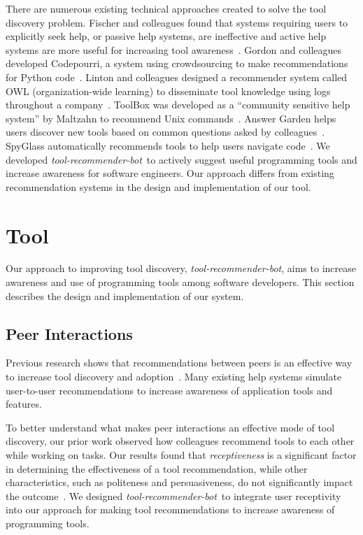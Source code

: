 \documentclass[conference]{IEEEtran}
\newcommand{\tool}{\textsl{tool-recommender-bot}}
\begin{document}
There are numerous existing technical approaches created to solve the tool discovery problem. Fischer and colleagues found that systems requiring users to explicitly seek help, or passive help systems, are ineffective and active help systems are more useful for increasing tool awareness~\cite{Fischer1984ActiveHelpSystems}. Gordon and colleagues developed Codepourri, a system using crowdsourcing to make recommendations for Python code~\cite{Gordon2015Codepourri}. Linton and colleagues designed a recommender system called OWL (organization-wide learning) to disseminate tool knowledge using logs throughout a company~\cite{Linton2000OWL}. ToolBox was developed as a ``community sensitive help system'' by Maltzahn to recommend Unix commands~\cite{Maltzahn1995Toolbox}. Answer Garden helps users discover new tools based on common questions asked by colleagues~\cite{Ackerman1990AnswerGarden}. SpyGlass automatically recommends tools to help users navigate code~\cite{Viriyakattiyaporn2010Spyglass}. We developed \tool~to actively suggest useful programming tools and increase awareness for software engineers. Our approach differs from existing recommendation systems in the design and implementation of our tool.

\section{Tool}
Our approach to improving tool discovery, \tool, aims to increase awareness and use of programming tools among software developers. This section describes the design and implementation of our system.

\subsection{Peer Interactions}
Previous research shows that recommendations between peers is an effective way to increase tool discovery and adoption~\cite{MurphyHill2011PeerInteraction}. Many existing help systems simulate user-to-user recommendations to increase awareness of application tools and features. 

To better understand what makes peer interactions an effective mode of tool discovery, our prior work observed how colleagues recommend tools to each other while working on tasks. Our results found that \emph{receptiveness} is a significant factor in determining the effectiveness of a tool recommendation, while other characteristics, such as politeness and persuasiveness, do not significantly impact the outcome~\cite{vlhcc17}. We designed \tool~to integrate user receptivity into our approach for making tool recommendations to increase awareness of programming tools.
\end{document}
